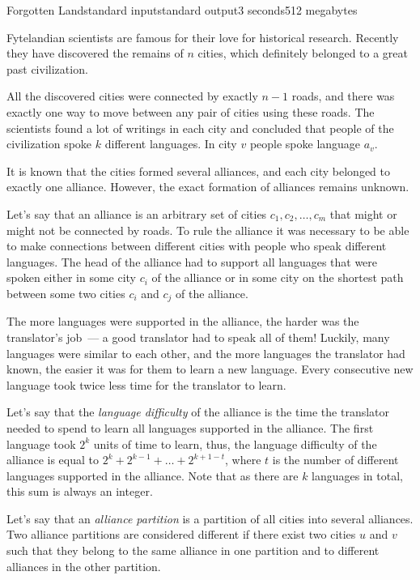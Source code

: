 \begin{problem}{Forgotten Land}{standard input}{standard output}{3 seconds}{512 megabytes}

Fytelandian scientists are famous for their love for historical research. Recently they have discovered the remains of $n$ cities, which definitely belonged to a great past civilization.

All the discovered cities were connected by exactly $n-1$ roads, and there was exactly one way to move between any pair of cities using these roads. The scientists found a lot of writings in each city and concluded that people of the civilization spoke $k$ different languages. In city $v$ people spoke language $a_v$.

It is known that the cities formed several alliances, and each city belonged to exactly one alliance. However, the exact formation of alliances remains unknown.

Let's say that an alliance is an arbitrary set of cities $c_1, c_2, \ldots, c_m$ that might or might not be connected by roads. To rule the alliance it was necessary to be able to make connections between different cities with people who speak different languages. The head of the alliance had to support all languages that were spoken either in some city $c_i$ of the alliance or in some city on the shortest path between some two cities $c_i$ and $c_j$ of the alliance.

The more languages were supported in the alliance, the harder was the translator's job~--- a good translator had to speak all of them! Luckily, many languages were similar to each other, and the more languages the translator had known, the easier it was for them to learn a new language. Every consecutive new language took twice less time for the translator to learn. 

Let's say that the \textit{language difficulty} of the alliance is the time the translator needed to spend to learn all languages supported in the alliance. The first language took $2^k$ units of time to learn, thus, the language difficulty of the alliance is equal to $2^k+2^{k-1}+\ldots+2^{k+1-t}$, where $t$ is the number of different languages supported in the alliance. Note that as there are $k$ languages in total, this sum is always an integer.

Let's say that an \textit{alliance partition} is a partition of all cities into several alliances. Two alliance partitions are considered different if there exist two cities $u$ and $v$ such that they belong to the same alliance in one partition and to different alliances in the other partition.


\end{problem}
